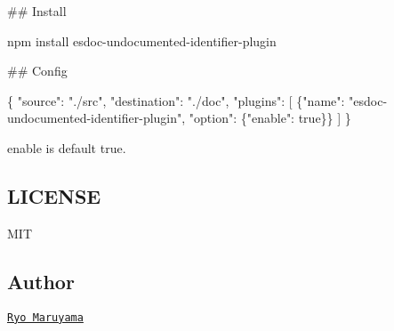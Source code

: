 \#\# Install 
\begin{DoxyCode}
npm install esdoc-undocumented-identifier-plugin
\end{DoxyCode}


\#\# Config 
\begin{DoxyCode}
\{
  "source": "./src",
  "destination": "./doc",
  "plugins": [
    \{"name": "esdoc-undocumented-identifier-plugin", "option": \{"enable": true\}\}
  ]
\}
\end{DoxyCode}


{\ttfamily enable} is default {\ttfamily true}.

\subsection*{L\+I\+C\+E\+N\+SE}

M\+IT

\subsection*{Author}

\href{https://github.com/h13i32maru}{\tt Ryo Maruyama} 